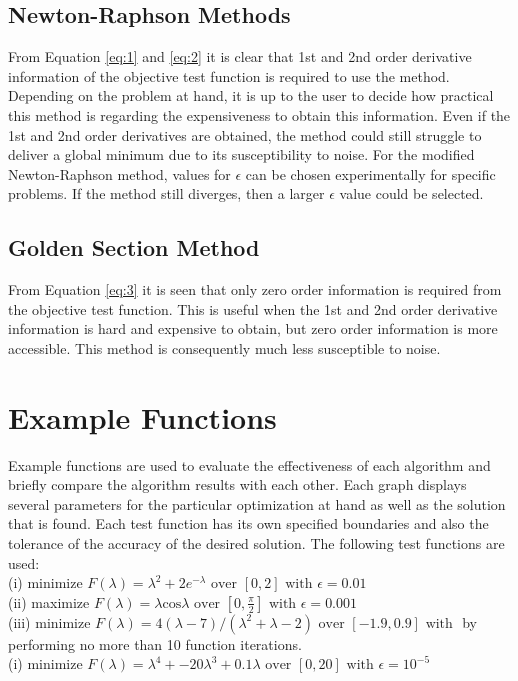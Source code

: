 \documentclass[a4paper,10pt]{article}
\begin{document}
\subsection{Newton-Raphson Methods}
From Equation \ref{eq:1} and \ref{eq:2} it is clear that 1st and 2nd order derivative information of the objective test function is required to use the method. Depending on the problem at hand, it is up to the user to decide how practical this method is regarding the expensiveness to obtain this information. Even if the 1st and 2nd order derivatives are obtained, the method could still struggle to deliver a global minimum due to its susceptibility to noise. For the modified Newton-Raphson method, values for $\epsilon$ can be chosen experimentally for specific problems. If the method still diverges, then a larger $\epsilon$ value could be selected.

\subsection{Golden Section Method}
From Equation \ref{eq:3} it is seen that only zero order information is required from the objective test function. This is useful when the 1st and 2nd order derivative information is hard and expensive to obtain, but zero order information is more accessible. This method is consequently much less susceptible to noise.

\section{Example Functions}
Example functions are used to evaluate the effectiveness of each algorithm and briefly compare the algorithm results with each other. Each graph displays several parameters for the particular optimization at hand as well as the solution that is found. Each test function has its own specified boundaries and also the tolerance of the accuracy of the desired solution. The following test functions are used:
\\[0.5cm]
(i) minimize $F(\lambda) = \lambda^{2} + 2e^{-\lambda} \text{ over } [0,2] \text{ with } \epsilon = 0.01$
\\[0.5cm]
(ii) maximize $F(\lambda) = \lambda \text{cos} \lambda \text{ over } [0,\frac{\pi}{2}] \text{ with } \epsilon = 0.001$
\\[0.5cm]
(iii) minimize $F(\lambda) = 4(\lambda - 7) / (\lambda^{2} + \lambda - 2) \text{ over } [-1.9,0.9] \text{ with }$ by performing no more than 10 function iterations.
\\[0.5cm]
(i) minimize $F(\lambda) = \lambda^{4} + -20\lambda^{3} + 0.1\lambda \text{ over } [0,20] \text{ with } \epsilon = 10^{-5}$
\end{document}
